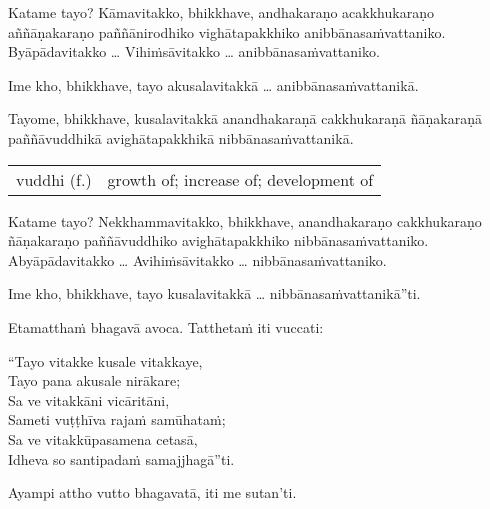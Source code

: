 \documentclass[11pt,oneside]{memoir}
\begin{document}
Katame tayo? Kāmavitakko, bhikkhave, andhakaraṇo acakkhukaraṇo aññāṇakaraṇo
paññānirodhiko vighātapakkhiko anibbānasaṁvattaniko. Byāpādavitakko \ldots{} Vihiṁsāvitakko \ldots{} anibbānasaṁvattaniko.

Ime kho, bhikkhave, tayo akusalavitakkā \ldots{} anibbānasaṁvattanikā.

Tayome, bhikkhave, kusalavitakkā anandhakaraṇā cakkhukaraṇā ñāṇakaraṇā
paññāvuddhikā avighātapakkhikā nibbānasaṁvattanikā.

\begin{longtable}{L{\colOne} L{\colTwo}}
vuddhi (f.) & growth of; increase of; development of\\[0pt]
\end{longtable}

Katame tayo? Nekkhammavitakko, bhikkhave, anandhakaraṇo cakkhukaraṇo ñāṇakaraṇo paññāvuddhiko
avighātapakkhiko nibbānasaṁvattaniko. Abyāpādavitakko \ldots{} Avihiṁsāvitakko \ldots{} nibbānasaṁvattaniko.

Ime kho, bhikkhave, tayo kusalavitakkā \ldots{} nibbānasaṁvattanikā”ti.

Etamatthaṁ bhagavā avoca. Tatthetaṁ iti vuccati:

“Tayo vitakke kusale vitakkaye, \\[0pt]
Tayo pana akusale nirākare; \\[0pt]
Sa ve vitakkāni vicāritāni, \\[0pt]
Sameti vuṭṭhīva rajaṁ samūhataṁ; \\[0pt]
Sa ve vitakkūpasamena cetasā, \\[0pt]
Idheva so santipadaṁ samajjhagā”ti.

Ayampi attho vutto bhagavatā, iti me sutan'ti.
\end{document}
